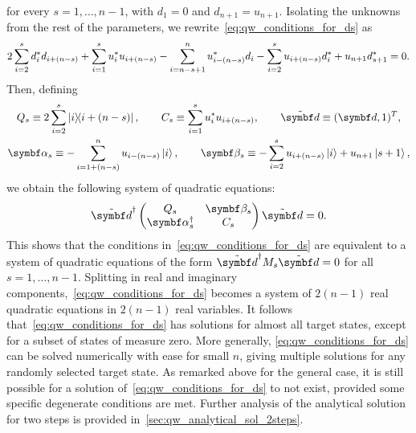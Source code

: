 for every $s=1,\dots,n-1$,
with $d_1=0$ and $d_{n+1}=u_{n+1}$.
Isolating the unknowns from the rest of the parameters, we rewrite~\cref{eq:qw_conditions_for_ds} as
\begin{equation}\footnotesize
    2\sum_{i=2}^s d_i^* d_{i+(n-s)}
    + \sum_{i=1}^s u_i^* u_{i+(n-s)}
    - \sum_{i=n-s+1}^{n} u_{i-(n-s)}^* d_i
    - \sum_{i=2}^{s} u_{i+(n-s)} d_i^*
    + u_{n+1} d_{s+1}^* 
    = 0.
\end{equation}
Then, defining
\begin{equation}
\begin{gathered}
    Q_s \equiv 2\sum_{i=2}^s \ketbra{i}{i+(n-s)},
    \qquad
    C_s \equiv \sum_{i=1}^s u_i^* u_{i+(n-s)},
    \qquad
    \tilde{\bs d} \equiv (\bs d, 1)^T, \\
    \bs\alpha_s \equiv -\sum_{i=1+(n-s)}^n u_{i-(n-s)}\ket{i},
    \qquad
    \bs\beta_s \equiv -\sum_{i=2}^{s} u_{i+(n-s)}\ket{i} + u_{n+1} \ket{s+1},
\end{gathered}
\end{equation}
we obtain the following system of quadratic equations:
\begin{equation}
    \tilde{\bs d}^\dagger
    \begin{pmatrix}
        Q_s & \bs\beta_s \\
        \bs\alpha_s^\dagger & C_s
    \end{pmatrix}
    \tilde{\bs d} = 0.
\end{equation}
This shows that the conditions in~\cref{eq:qw_conditions_for_ds} are equivalent to a system of quadratic equations of the form $\tilde{\bs d}^\dagger M_s \tilde{\bs d}=0$ for all $s=1,\dots,n-1$.
Splitting in real and imaginary components,~\cref{eq:qw_conditions_for_ds} becomes a system of $2(n-1)$ real quadratic equations in $2(n-1)$ real variables.
It follows that~\cref{eq:qw_conditions_for_ds} has solutions for almost all target states, except for a subset of states of measure zero.
More generally, \cref{eq:qw_conditions_for_ds}
can be solved numerically with ease for small $n$, giving multiple solutions for any randomly selected target state.
As remarked above for the general case, it is still possible for a solution of~\cref{eq:qw_conditions_for_ds} to not exist, provided some specific degenerate conditions are met.
Further analysis of the analytical solution for two steps is provided in~\cref{sec:qw_analytical_sol_2steps}.

